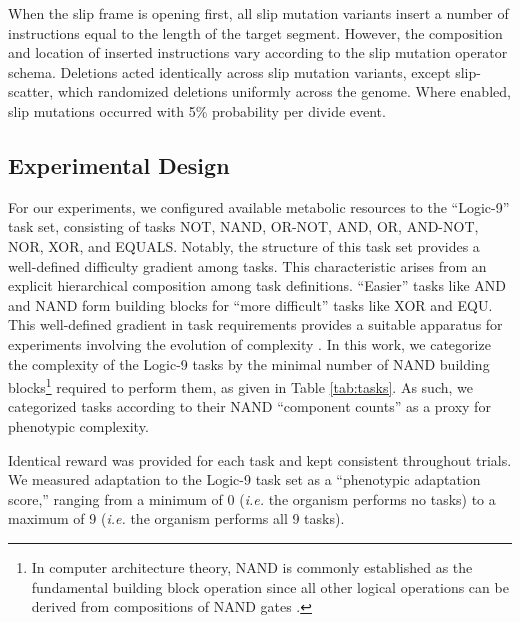 When the slip frame is opening first, all slip mutation variants insert a number of instructions equal to the length of the target segment.
However, the composition and location of inserted instructions vary according to the slip mutation operator schema.
Deletions acted identically across slip mutation variants, except slip-scatter, which randomized deletions uniformly across the genome.
Where enabled, slip mutations occurred with 5\% probability per divide event.

\subsection{Experimental Design}



For our experiments, we configured available metabolic resources to the ``Logic-9'' task set, consisting of tasks NOT, NAND, OR-NOT, AND, OR, AND-NOT, NOR, XOR, and EQUALS.
Notably, the structure of this task set provides a well-defined difficulty gradient among tasks.
This characteristic arises from an explicit hierarchical composition among task definitions.
``Easier'' tasks like AND and NAND form building blocks for ``more difficult'' tasks like XOR and EQU.
This well-defined gradient in task requirements provides a suitable apparatus for experiments involving the evolution of complexity \citep{lenski2003evolutionary}.
In this work, we categorize the complexity of the Logic-9 tasks by the minimal number of NAND building blocks\footnote{
In computer architecture theory, NAND is commonly established as the fundamental building block operation since all other logical operations can be derived from compositions of NAND gates \citep{mano1997logic}.
} required to perform them, as given in Table \ref{tab:tasks}.
As such, we categorized tasks according to their NAND ``component counts'' as a proxy for phenotypic complexity.

Identical reward was provided for each task and kept consistent throughout trials.
We measured adaptation to the Logic-9 task set as a ``phenotypic adaptation score,'' ranging from a minimum of 0 (\textit{i.e.} the organism performs no tasks) to a maximum of 9 (\textit{i.e.} the organism performs all 9 tasks).

